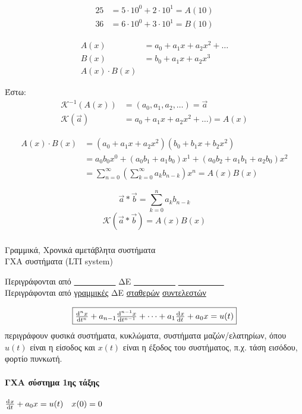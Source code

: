 \documentclass[11pt,a4paper,titlepage,final]{article}
\begin{document}
\begin{align*}
25 &= 5\cdot10^0+2\cdot10^1 = A(10)\\36&=6\cdot10^0+3\cdot10^1 = B(10)
\end{align*}

\begin{align*}
A(x) &= a_0 +a_1x+a_2x^2+\dots\\
B(x) &= b_0+a_1x+a_2x^3\\
A(x) \cdot B(x) &
\end{align*}

Έστω: \begin{align*}
\mathscr K^{-1}\left(A(x)\right) &= (a_0,a_1,a_2,\dots) = \vec{a}\\
\mathscr K\left(\vec a\right) &= a_0+a_1x+a_2x^2+ \dots) = A(x)
\end{align*}

\begin{align*}
A(x)\cdot B(x) &= (a_0+a_1x+a_2x^2)(b_0+b_1x+b_2x^2)
\\ &=
a_0b_0 x^0 + (a_0b_1+a_1b_0)x^1 + (a_0b_2+a_1b_1+a_2b_0)x^2
\\ &= \boxed{
\sum_{n=0}^\infty \left(
\sum_{k=0}^\infty a_k b_{n-k}
\right) x^n = A(x)B(x)}
\end{align*}

\[
\vec a * \vec b = \sum_{k=0}^n a_k b_{n-k}
\]
\[
\mathscr K(\vec a * \vec b)  = A(x)B(x)
\]

\subsubsection{}
Γραμμικά, Χρονικά αμετάβλητα συστήματα\\
ΓΧΑ συστήματα (\textlatin{LTI system})

Περιγράφονται από \underline{\ \ \ \ \ \ \ \ \ \ } ΔΕ \underline{\ \ \ \ \ \ \ \ \ \ } \underline{\ \ \ \ \ \ \ \ \ \ \ }\\
Περιγράφονται από \underline{γραμμικές} ΔΕ \underline{σταθερών} \underline{συντελεστών}

\[
\boxed{
\od[n]{x}{t} + a_{n-1}\od[n-1]{x}{t} + \dots + a_1\od{x}{t} + a_0x = u(t)
}
\]
περιγράφουν φυσικά συστήματα, κυκλώματα, συστήματα μαζών/ελατηρίων, όπου \(u(t)\) είναι η είσοδος και \(x(t)\) είναι η έξοδος του συστήματος, π.χ. τάση εισόδου, φορτίο πυνκωτή.

	
\paragraph{ΓΧΑ σύστημα 1ης τάξης}
\(
\od{x}{t} + a_0x =u(t) \quad x(0)= 0
\)
\end{document}
